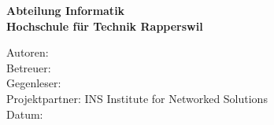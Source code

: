 \begin{titlepage}
\begin{flushleft}
{\large \bfseries Abteilung Informatik}\\
{\large \bfseries Hochschule für Technik Rapperswil}\\

\vfill

Autoren: \AUTHOR \\
Betreuer: \SUPERVISOR \\
Gegenleser: \GEGENLESER \\
Projektpartner: INS Institute for Networked Solutions \\
Datum: {\DATE}

\end{flushleft}
\end{titlepage}
